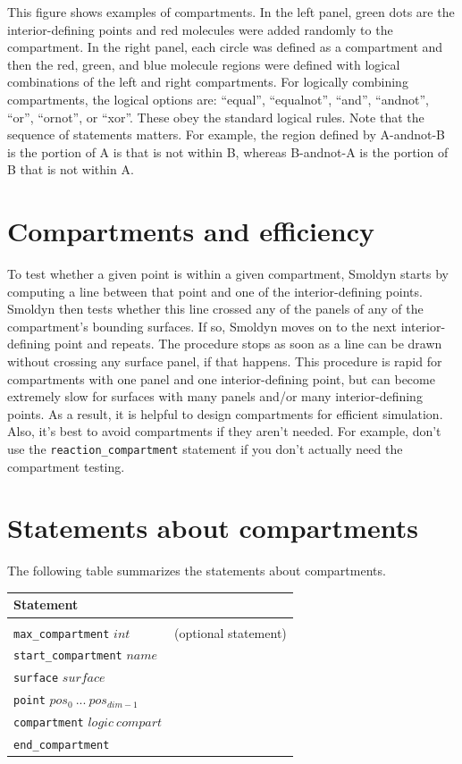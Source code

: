 \documentclass {book}
\newcommand {\ttt} {\texttt}
\begin{document}
This figure shows examples of compartments. In the left panel, green dots are the interior-defining points and red molecules were added randomly to the compartment. In the right panel, each circle was defined as a compartment and then the red, green, and blue molecule regions were defined with logical combinations of the left and right compartments.
For logically combining compartments, the logical options are: ``equal'', ``equalnot'', ``and'', ``andnot'', ``or'', ``ornot'', or ``xor''. These obey the standard logical rules. Note that the sequence of statements matters. For example, the region defined by A-andnot-B is the portion of A is that is not within B, whereas B-andnot-A is the portion of B that is not within A.

\section{Compartments and efficiency}

To test whether a given point is within a given compartment, Smoldyn starts by computing a line between that point and one of the interior-defining points. Smoldyn then tests whether this line crossed any of the panels of any of the compartment's bounding surfaces. If so, Smoldyn moves on to the next interior-defining point and repeats. The procedure stops as soon as a line can be drawn without crossing any surface panel, if that happens. This procedure is rapid for compartments with one panel and one interior-defining point, but can become extremely slow for surfaces with many panels and/or many interior-defining points. As a result, it is helpful to design compartments for efficient simulation. Also, it's best to avoid compartments if they aren't needed. For example, don't use the \ttt{reaction\_compartment} statement if you don't actually need the compartment testing.

\section{Statements about compartments}

The following table summarizes the statements about compartments.

\begin{longtable}[c]{ll}
Statement\\
\hline \\
\ttt{max\_compartment} $int$ & (optional statement)\\
\ttt{start\_compartment} $name$\\
\ttt{surface} $surface$\\
\ttt{point} $pos_0\ ...\ pos_{dim-1}$\\
\ttt{compartment} $logic\ compart$\\
\ttt{end\_compartment}
\end{longtable}
\end{document}
